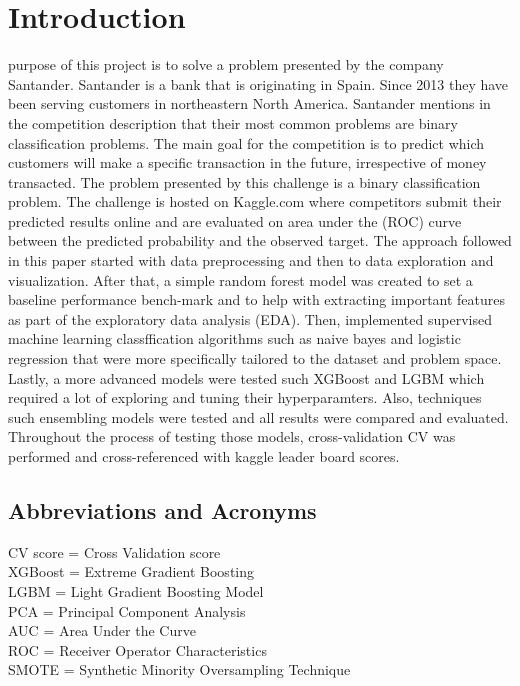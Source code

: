 \documentclass[journal,twoside,web]{ieeecolor}
\begin{document}
\section{Introduction}
\label{sec:introduction}
 purpose of this project is to solve a problem presented by the company Santander. Santander is a bank that is originating in Spain. Since 2013 they have been serving customers in northeastern North America. Santander mentions in the competition description that their most common problems are binary classification problems. The main goal for the competition is to predict which customers will make a specific transaction in the future, irrespective of money transacted. The problem presented by this challenge is a binary classification problem. The challenge is hosted on Kaggle.com where competitors submit their predicted results online and are evaluated on area under the (ROC) curve between the predicted probability and the observed target. The approach followed in this paper started with data preprocessing and then to data exploration and visualization. After that, a simple random forest model was created to set a baseline performance bench-mark and to help with extracting important features as part of the exploratory data analysis (EDA). Then, implemented supervised machine learning classffication algorithms such as naive bayes and logistic regression that were more specifically tailored to the dataset and problem space. Lastly, a more advanced models were tested such XGBoost and LGBM which required a lot of exploring and tuning their hyperparamters. Also, techniques such ensembling models were tested and all results were compared and evaluated. Throughout the process of testing those models, cross-validation CV was performed and cross-referenced with kaggle leader board scores.

\subsection{Abbreviations and Acronyms}
CV score = Cross Validation score \\
XGBoost = Extreme Gradient Boosting  \\
LGBM = Light Gradient Boosting Model \\
PCA = Principal Component Analysis \\
AUC = Area Under the Curve \\
ROC = Receiver Operator Characteristics \\
SMOTE = Synthetic Minority Oversampling Technique 
\end{document}
